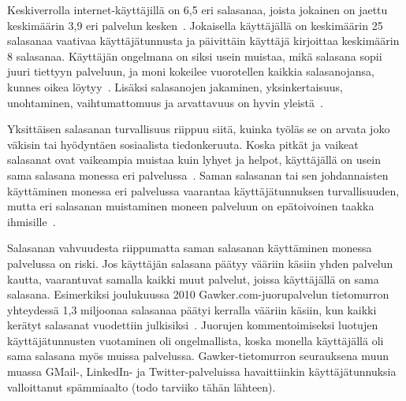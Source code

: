 \documentclass[finnish,gradu]{tktltiki}
\begin{document}
  Keskiverrolla internet-käyttäjillä on 6,5 eri salasanaa, joista jokainen on jaettu keskimäärin 3,9 eri palvelun kesken~\cite{study_of_passwords_07}. Jokaisella käyttäjällä on keskimäärin 25 salasanaa vaativaa käyttäjätunnusta ja päivittäin käyttäjä kirjoittaa keskimäärin 8 salasanaa. Käyttäjän ongelmana on siksi usein muistaa, mikä salasana sopii juuri tiettyyn palveluun, ja moni kokeilee vuorotellen kaikkia salasanojansa, kunnes oikea löytyy~\cite{study_of_passwords_07}. Lisäksi salasanojen jakaminen, yksinkertaisuus, unohtaminen, vaihtumattomuus ja arvattavuus on hyvin yleistä~\cite{password_management_strategies_06, pw_auth_system_perspective_08, passpet_06}.

  Yksittäisen salasanan turvallisuus riippuu siitä, kuinka työläs se on arvata joko väkisin tai hyödyntäen sosiaalista tiedonkeruuta. Koska pitkät ja vaikeat salasanat ovat vaikeampia muistaa kuin lyhyet ja helpot, käyttäjällä on usein sama salasana monessa eri palvelussa~\cite{study_of_passwords_07}. Saman salasanan tai sen johdannaisten käyttäminen monessa eri palvelussa vaarantaa käyttäjätunnuksen turvallisuuden, mutta eri salasanan muistaminen moneen palveluun on epätoivoinen taakka ihmisille~\cite{password_management_strategies_06, passpet_06, pw_auth_system_perspective_08, users_are_not_the_enemy_99}.

  Salasanan vahvuudesta riippumatta saman salasanan käyttäminen monessa palvelussa on riski. Jos käyttäjän salasana päätyy vääriin käsiin yhden palvelun kautta, vaarantuvat samalla kaikki muut palvelut, joissa käyttäjällä on sama salasana. Esimerkiksi joulukuussa 2010 Gawker.com-juorupalvelun tietomurron yhteydessä 1,3 miljoonaa salasanaa päätyi kerralla vääriin käsiin, kun kaikki kerätyt salasanat vuodettiin julkisiksi~\cite{bbc_gawker_12_2010, forbes_gawker_12_2010}. Juorujen kommentoimiseksi luotujen käyttäjätunnusten vuotaminen oli ongelmallista, koska monella käyttäjällä oli sama salasana myös muissa palvelussa. Gawker-tietomurron seurauksena muun muassa GMail-, LinkedIn- ja Twitter-palveluissa havaittiinkin käyttäjätunnuksia valloittanut spämmiaalto (todo tarviiko tähän lähteen).
\end{document}

